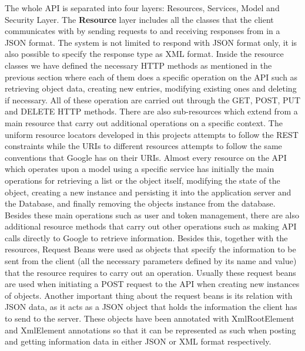 The whole API is separated into four layers: Resources, Services, Model and Security Layer. The \textbf{Resource} layer includes all the classes that the client communicates with by sending requests to and receiving responses from in a JSON format. The system is not limited to respond with JSON format only, it is also possible to specify the response type as XML format. Inside the resource classes we have defined the necessary HTTP methods as mentioned in the previous section where each of them does a specific operation on the API such as retrieving object data, creating new entries, modifying existing ones and deleting if necessary. All of these operation are carried out through the GET, POST, PUT and DELETE HTTP methods. There are also sub-resources which extend from a main resource that carry out additional operations on a specific context. 
The uniform resource locators developed in this projects attempts to follow the REST constraints while the URIs to different resources attempts to follow the same conventions that Google has on their URIs. 
Almost every resource on the API which operates upon a model using a specific service has initially the main operations for retrieving a list or the object itself, modifying the state of the object, creating a new instance and persisting it into the application server and the Database, and finally removing the objects instance from the database. Besides these main operations such as user and token management, there are also additional resource methods that carry out other operations such as making API calls directly to Google to retrieve information. 
Besides this, together with the resources, Request Beans were used as objects that specify the information to be sent from the client (all the necessary parameters defined by its name and value) that the resource requires to carry out an operation. Usually these request beans are used when initiating a POST request to the API when creating new instances of objects. Another important thing about the request beans is its relation with JSON data, as it acts as a JSON object that holds the information the client has to send to the server. These objects have been annotated with XmlRootElement and XmlElement annotations so that it can be represented as such when posting and getting information data in either JSON or XML format respectively.

